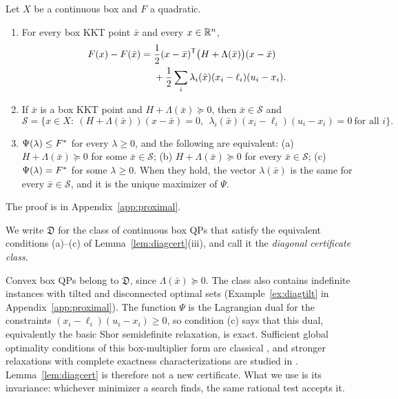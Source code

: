 \begin{lemma}\label{lem:diagcert}
Let $X$ be a continuous box and $F$ a quadratic.
\begin{enumerate}
\item[(i)] For every box KKT point $\bar x$ and every $x\in\mathbb R^n$,
\begin{equation}\label{eq:diagid}
\begin{split}
F(x)-F(\bar x)={}&\frac12(x-\bar x)^{\mathsf T}\bigl(H+\Lambda(\bar x)\bigr)(x-\bar x)\\
&+\frac12\sum_i\lambda_i(\bar x)(x_i-\ell_i)(u_i-x_i).
\end{split}
\end{equation}
\item[(ii)] If $\bar x$ is a box KKT point and $H+\Lambda(\bar x)\succeq0$,
then $\bar x\in\mathcal S$ and
\begin{equation}\label{eq:diagset}
\mathcal S=\bigl\{x\in X:\ (H+\Lambda(\bar x))(x-\bar x)=0,\ \
\lambda_i(\bar x)(x_i-\ell_i)(u_i-x_i)=0\ \text{for all }i\bigr\}.
\end{equation}
\item[(iii)] $\Psi(\lambda)\le F^{*}$ for every $\lambda\ge0$, and the
following are equivalent: (a) $H+\Lambda(\bar x)\succeq0$ for some
$\bar x\in\mathcal S$; (b) $H+\Lambda(\bar x)\succeq0$ for every
$\bar x\in\mathcal S$; (c) $\Psi(\lambda)=F^{*}$ for some $\lambda\ge0$. When
they hold, the vector $\lambda(\bar x)$ is the same for every
$\bar x\in\mathcal S$, and it is the unique maximizer of $\Psi$.
\end{enumerate}
\end{lemma}

The proof is in Appendix~\ref{app:proximal}.

We write $\mathfrak D$ for the class of continuous box QPs that satisfy the
equivalent conditions (a)--(c) of Lemma~\ref{lem:diagcert}(iii), and call it
the \emph{diagonal certificate class}.

\begin{remark}\label{rem:shor}
Convex box QPs belong to $\mathfrak D$, since $\Lambda(\bar x)\succeq0$. The
class also contains indefinite instances with tilted and disconnected optimal
sets (Example~\ref{ex:diagtilt} in Appendix~\ref{app:proximal}). The function
$\Psi$ is the Lagrangian dual for the constraints
$(x_i-\ell_i)(u_i-x_i)\ge0$, so condition (c) says that this dual,
equivalently the basic Shor semidefinite relaxation, is exact. Sufficient
global optimality conditions of this box-multiplier form are classical
\cite{JeyakumarRubinovWu2006,LiWuQuan2015}, and stronger relaxations with
complete exactness characterizations are studied in \cite{QiuYildirim2024}.
Lemma~\ref{lem:diagcert} is therefore not a new certificate. What we use is
its invariance: whichever minimizer a search finds, the same rational test
accepts it.
\end{remark}

